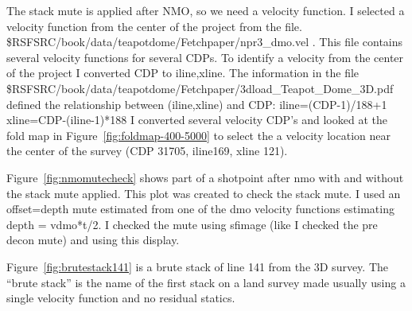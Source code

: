 The stack mute is applied after NMO, so we need a velocity function.  I selected a velocity function from the center of the project from the file. \$RSFSRC/book/data/teapotdome/Fetchpaper/npr3\_dmo.vel . This file contains several velocity functions for several CDPs.  To identify a velocity from the center of the project I converted CDP to iline,xline.  The information in the file  \$RSFSRC/book/data/teapotdome/Fetchpaper/3dload\_Teapot\_Dome\_3D.pdf defined the relationship between (iline,xline) and CDP:
iline=(CDP-1)/188+1
xline=CDP-(iline-1)*188
I converted several velocity CDP’s and looked at the fold map in Figure~\ref{fig:foldmap-400-5000} to select the a velocity location near the center of the survey (CDP 31705, iline169, xline 121).

Figure~\ref{fig:nmomutecheck} shows part of a shotpoint after nmo with and without the stack mute applied.  This plot was created to check the stack mute.  I used an offset=depth mute estimated from one of the dmo velocity functions estimating depth = vdmo*t/2.   I checked the mute using sfimage (like I checked the pre decon mute) and using this display.

Figure~\ref{fig:brutestack141} is a brute stack of line 141 from the 3D survey.  The “brute stack” is the name of the first stack on a land survey made usually using a single velocity function and no residual statics.







